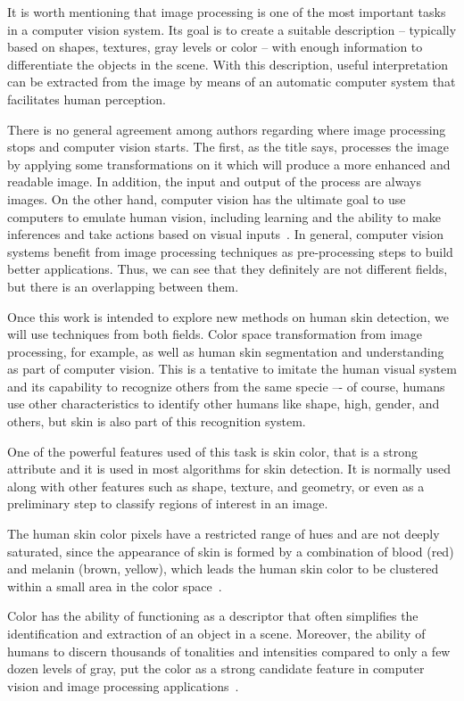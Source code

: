 It is worth mentioning that image processing is one of the most important tasks in a computer vision system. Its goal is to create a suitable description -- typically based on shapes, textures, gray levels or color -- with enough information to differentiate the objects in the scene. With this description, useful interpretation can be extracted from the image by means of an automatic computer system that facilitates human perception.

There is no general agreement among authors regarding where image processing stops and computer vision starts. The first, as the title says, processes the image by applying some transformations on it which will produce a more enhanced and readable image. In addition, the input and output of the process are always images. On the other hand, computer vision has the ultimate goal to use computers to emulate human vision, including learning and the ability to make inferences and take actions based on visual inputs~\citep{gonzalez:02}. In general,
computer vision systems benefit from image processing techniques as pre-processing steps to build better applications. Thus, we can see that they definitely are not different fields, but there is an overlapping between them.

Once this work is intended to explore new methods on human skin detection, we will use techniques from both fields. Color space transformation from image processing, for example, as well as human skin segmentation and understanding as part of computer vision. This is a tentative to imitate the human visual system and its capability to recognize others from the same specie –- of course, humans use other characteristics to identify other humans like shape, high, gender, and others, but skin is also part of this recognition system.

One of the powerful features used of this task is skin color, that is a strong attribute and it is used in most algorithms for skin detection. It is normally used along with other features such as shape, texture, and geometry, or even as a preliminary step to classify regions of interest in an image.

The human skin color pixels have a restricted range of hues and are not deeply saturated, since the appearance of skin is formed by a combination of blood (red) and melanin (brown, yellow), which leads the human skin color to be clustered within a small area in the color space~\citep{fleck:96}.

Color has the ability of functioning as a descriptor that often simplifies the identification and extraction of an object in a scene. Moreover, the ability of humans to discern thousands of tonalities and intensities compared to only a few dozen levels of gray, put the color as a strong candidate feature in computer vision and image processing applications~\citep{gonzalez:02}.


